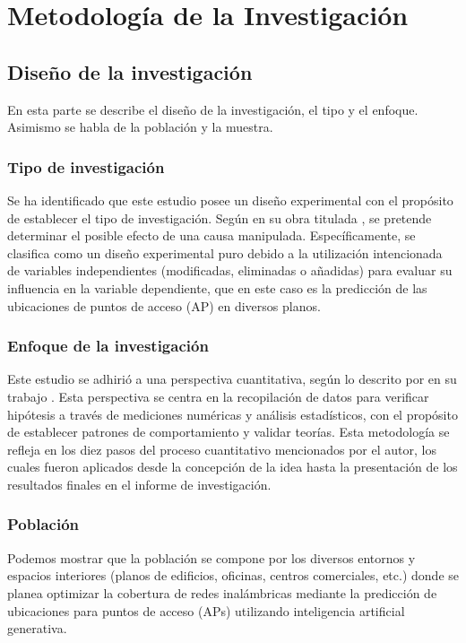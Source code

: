 \chapter{Metodología de la Investigación}
\section{Diseño de la investigación}
En esta parte se describe el diseño de la investigación, el tipo y el enfoque. Asimismo se habla de la población y la muestra.

\subsection{Tipo de investigación}
Se ha identificado que este estudio posee un diseño experimental con el propósito de establecer el tipo de investigación. Según \cite{bk_hernandez2014metodologia} en su obra titulada , se pretende determinar el posible efecto de una causa manipulada. Específicamente, se clasifica como un diseño experimental puro debido a la utilización intencionada de variables independientes (modificadas, eliminadas o añadidas) para evaluar su influencia en la variable dependiente, que en este caso es la predicción de las ubicaciones de puntos de acceso (AP) en diversos planos.

\subsection{Enfoque de la investigación}
Este estudio se adhirió a una perspectiva cuantitativa, según lo descrito por \cite{bk_hernandez2014metodologia} en su trabajo . Esta perspectiva se centra en la recopilación de datos para verificar hipótesis a través de mediciones numéricas y análisis estadísticos, con el propósito de establecer patrones de comportamiento y validar teorías. Esta metodología se refleja en los diez pasos del proceso cuantitativo mencionados por el autor, los cuales fueron aplicados desde la concepción de la idea hasta la presentación de los resultados finales en el informe de investigación.

\subsection{Población}
Podemos mostrar que la población se compone por los diversos entornos y espacios interiores (planos de edificios, oficinas, centros comerciales, etc.) donde se planea optimizar la cobertura de redes inalámbricas mediante la predicción de ubicaciones para puntos de acceso (APs) utilizando inteligencia artificial generativa.

